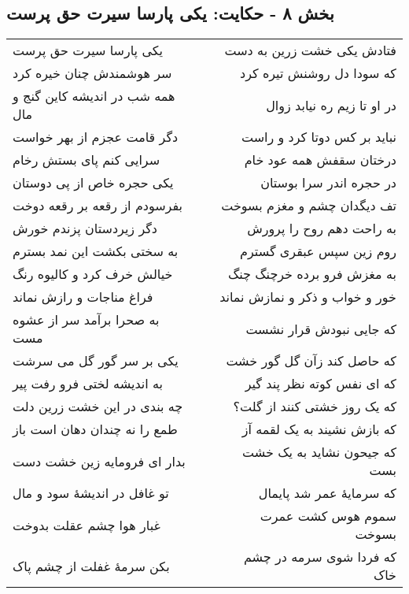 \begin{center}
\section*{بخش ۸ - حکایت: یکی پارسا سیرت حق پرست}
\label{sec:008}
\begin{longtable}{l p{0.5cm} r}
یکی پارسا سیرت حق پرست
&&
فتادش یکی خشت زرین به دست
\\
سر هوشمندش چنان خیره کرد
&&
که سودا دل روشنش تیره کرد
\\
همه شب در اندیشه کاین گنج و مال
&&
در او تا زیم ره نیابد زوال
\\
دگر قامت عجزم از بهر خواست
&&
نباید بر کس دوتا کرد و راست
\\
سرایی کنم پای بستش رخام
&&
درختان سقفش همه عود خام
\\
یکی حجره خاص از پی دوستان
&&
در حجره اندر سرا بوستان
\\
بفرسودم از رقعه بر رقعه دوخت
&&
تف دیگدان چشم و مغزم بسوخت
\\
دگر زیردستان پزندم خورش
&&
به راحت دهم روح را پرورش
\\
به سختی بکشت این نمد بسترم
&&
روم زین سپس عبقری گسترم
\\
خیالش خرف کرد و کالیوه رنگ
&&
به مغزش فرو برده خرچنگ چنگ
\\
فراغ مناجات و رازش نماند
&&
خور و خواب و ذکر و نمازش نماند
\\
به صحرا برآمد سر از عشوه مست
&&
که جایی نبودش قرار نشست
\\
یکی بر سر گور گل می سرشت
&&
که حاصل کند زآن گل گور خشت
\\
به اندیشه لختی فرو رفت پیر
&&
که ای نفس کوته نظر پند گیر
\\
چه بندی در این خشت زرین دلت
&&
که یک روز خشتی کنند از گلت؟
\\
طمع را نه چندان دهان است باز
&&
که بازش نشیند به یک لقمه آز
\\
بدار ای فرومایه زین خشت دست
&&
که جیحون نشاید به یک خشت بست
\\
تو غافل در اندیشهٔ سود و مال
&&
که سرمایهٔ عمر شد پایمال
\\
غبار هوا چشم عقلت بدوخت
&&
سموم هوس کشت عمرت بسوخت
\\
بکن سرمهٔ غفلت از چشم پاک
&&
که فردا شوی سرمه در چشم خاک
\\
\end{longtable}
\end{center}
